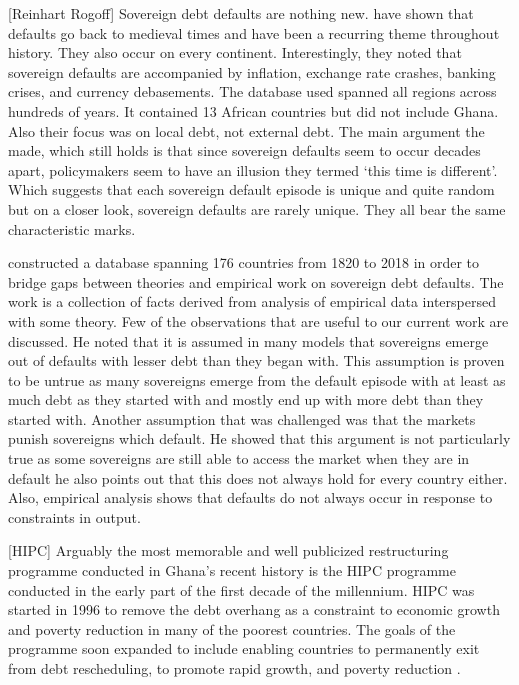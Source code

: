 \documentclass[14pt, a4paper]{article}
\begin{document}
	[Reinhart Rogoff] Sovereign debt defaults are nothing new.  have shown that defaults go back to medieval times and have been a recurring theme throughout history. They also occur on every continent. Interestingly, they noted that sovereign defaults are accompanied by inflation, exchange rate crashes, banking crises, and currency debasements. The database used spanned all regions across hundreds of years. It contained 13 African countries but did not include Ghana. Also their focus was on local debt, not external debt. The main argument the made, which still holds is that since sovereign defaults seem to occur decades apart, policymakers seem to have an illusion they termed `this time is different'. Which suggests that each sovereign default episode is unique and quite random but on a closer look, sovereign defaults are rarely unique. They all bear the same characteristic marks.
	
	
	 constructed a database spanning 176 countries from 1820 to 2018 in order to bridge gaps between theories and empirical work on sovereign debt defaults. The work is a collection of facts derived from analysis of empirical data interspersed with some theory. Few of the observations that are useful to our current work are discussed. He noted that it is assumed in many models that sovereigns emerge out of defaults with lesser debt than they began with. This assumption is proven to be untrue as many sovereigns emerge from the default episode with at least as much debt as they started with and mostly end up with more debt than they started with. Another assumption that was challenged was that the markets punish sovereigns which default. He showed that this argument is not particularly true as some sovereigns are still able to access the market when they are in default he also points out that this does not always hold for every country either. Also, empirical analysis shows that defaults do not always occur in response to constraints in output.
	
	
	
	[HIPC]
	Arguably the most memorable and well publicized restructuring programme conducted in Ghana's recent history is the HIPC programme conducted in the early part of the first decade of the millennium.  HIPC was started in 1996 to remove the debt overhang as a constraint to economic growth and poverty reduction in many of the poorest countries. The goals of the programme soon expanded to include enabling countries to permanently exit from debt rescheduling, to promote rapid growth, and poverty reduction \cite{gautam2003debt}.
	
\end{document}
